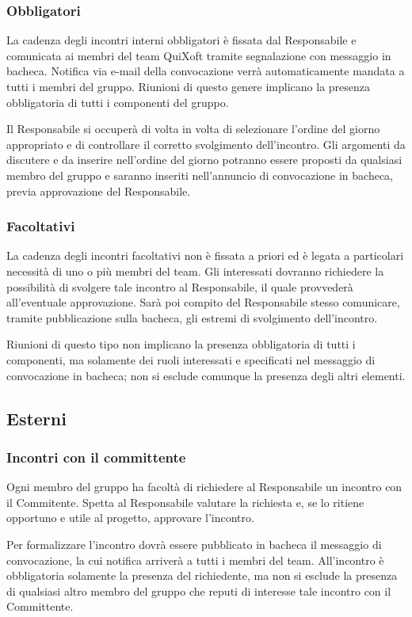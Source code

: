 \documentclass[11pt,a4paper]{article}
\begin{document}
\subsubsection{Obbligatori}
La cadenza degli incontri interni obbligatori è fissata dal Responsabile e comunicata ai membri del team QuiXoft tramite segnalazione con messaggio in bacheca.
Notifica via e-mail della convocazione verrà automaticamente mandata a tutti i membri del gruppo.
Riunioni di questo genere implicano la presenza obbligatoria di tutti i componenti del gruppo.

Il Responsabile si occuperà di volta in volta di selezionare l'ordine del giorno appropriato e di controllare il corretto svolgimento dell'incontro.
Gli argomenti da discutere e da inserire nell'ordine del giorno potranno essere proposti da qualsiasi membro del gruppo e saranno inseriti nell'annuncio di convocazione in bacheca, previa approvazione del Responsabile.
\subsubsection{Facoltativi}
La cadenza degli incontri facoltativi non è fissata a priori ed è legata a particolari necessità di uno o più membri del team.
Gli interessati dovranno richiedere la possibilità di svolgere tale incontro al Responsabile, il quale provvederà all'eventuale approvazione.
Sarà poi compito del Responsabile stesso comunicare, tramite pubblicazione sulla bacheca, gli estremi di svolgimento dell'incontro.

Riunioni di questo tipo non implicano la presenza obbligatoria di tutti i componenti, ma solamente dei ruoli interessati e specificati nel messaggio di convocazione in bacheca; non si esclude comunque la presenza degli altri elementi.
\subsection{Esterni}
\subsubsection{Incontri con il committente}
Ogni membro del gruppo ha facoltà di richiedere al Responsabile un incontro con il Commitente.
Spetta al Responsabile valutare la richiesta e, se lo ritiene opportuno e utile al progetto, approvare l'incontro.

Per formalizzare l'incontro dovrà essere pubblicato in bacheca il messaggio di convocazione, la cui notifica arriverà a tutti i membri del team.
All'incontro è obbligatoria solamente la presenza del richiedente, ma non si esclude la presenza di qualsiasi altro membro del gruppo che reputi di interesse tale incontro con il Committente.
\end{document}
